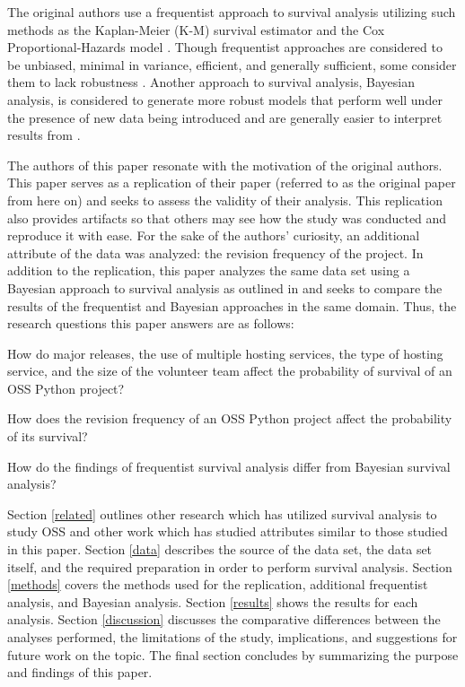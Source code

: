 \documentclass[acmconf]{acmart}
\begin{document}
The original authors use a frequentist approach to survival analysis utilizing such methods as the Kaplan-Meier (K-M) survival estimator and the Cox Proportional-Hazards model \cite{kaplan1958nonparametric, cox1972regression}.
Though frequentist approaches are considered to be unbiased, minimal in variance, efficient, and generally sufficient, some consider them to lack robustness \cite{renganathan2016overview}. Another approach to survival analysis, Bayesian analysis, is considered to generate more robust models that perform well under the presence of new data being introduced and are generally easier to interpret results from \cite{renganathan2016overview}.

The authors of this paper resonate with the motivation of the original authors. 
This paper serves as a replication of their paper \cite{ali2020cheating} (referred to as the original paper from here on) and seeks to assess the validity of their analysis.
This replication also provides artifacts so that others may see how the study was conducted and reproduce it with ease.
For the sake of the authors' curiosity, an additional attribute of the data was analyzed: the revision frequency of the project.
In addition to the replication, this paper analyzes the same data set using a Bayesian approach to survival analysis as outlined in \cite{kelter2020bayesian} and seeks to compare the results of the frequentist and Bayesian approaches in the same domain.
Thus, the research questions this paper answers are as follows:

\begin{questions}
    \item How do major releases, the use of multiple hosting services, the type of hosting service, and the size of the volunteer team affect the probability of survival of an OSS Python project?
    \item How does the revision frequency of an OSS Python project affect the probability of its survival?
    \item How do the findings of frequentist survival analysis differ from Bayesian survival analysis?
\end{questions}

Section \ref{related} outlines other research which has utilized survival analysis to study OSS and other work which has studied attributes similar to those studied in this paper.
Section \ref{data} describes the source of the data set, the data set itself, and the required preparation in order to perform survival analysis.
Section \ref{methods} covers the methods used for the replication, additional frequentist analysis, and Bayesian analysis.
Section \ref{results} shows the results for each analysis.
Section \ref{discussion} discusses the comparative differences between the analyses performed, the limitations of the study, implications, and suggestions for future work on the topic.
The final section concludes by summarizing the purpose and findings of this paper.
\end{document}
